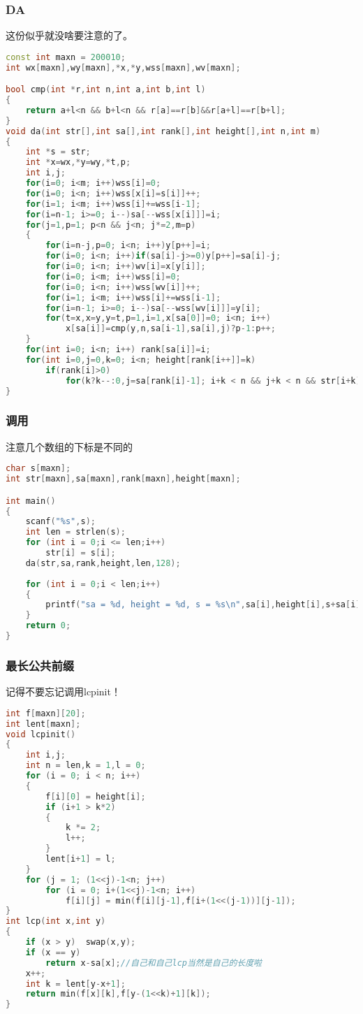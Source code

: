 	\subsubsection{DA}
		这份似乎就没啥要注意的了。
		\begin{lstlisting}[language=c++]
const int maxn = 200010;
int wx[maxn],wy[maxn],*x,*y,wss[maxn],wv[maxn];

bool cmp(int *r,int n,int a,int b,int l)
{
	return a+l<n && b+l<n && r[a]==r[b]&&r[a+l]==r[b+l];
}
void da(int str[],int sa[],int rank[],int height[],int n,int m)
{
	int *s = str;
	int *x=wx,*y=wy,*t,p;
	int i,j;
	for(i=0; i<m; i++)wss[i]=0;
	for(i=0; i<n; i++)wss[x[i]=s[i]]++;
	for(i=1; i<m; i++)wss[i]+=wss[i-1];
	for(i=n-1; i>=0; i--)sa[--wss[x[i]]]=i;
	for(j=1,p=1; p<n && j<n; j*=2,m=p)
	{
		for(i=n-j,p=0; i<n; i++)y[p++]=i;
		for(i=0; i<n; i++)if(sa[i]-j>=0)y[p++]=sa[i]-j;
		for(i=0; i<n; i++)wv[i]=x[y[i]];
		for(i=0; i<m; i++)wss[i]=0;
		for(i=0; i<n; i++)wss[wv[i]]++;
		for(i=1; i<m; i++)wss[i]+=wss[i-1];
		for(i=n-1; i>=0; i--)sa[--wss[wv[i]]]=y[i];
		for(t=x,x=y,y=t,p=1,i=1,x[sa[0]]=0; i<n; i++)
			x[sa[i]]=cmp(y,n,sa[i-1],sa[i],j)?p-1:p++;
	}
	for(int i=0; i<n; i++) rank[sa[i]]=i;
	for(int i=0,j=0,k=0; i<n; height[rank[i++]]=k)
		if(rank[i]>0)
			for(k?k--:0,j=sa[rank[i]-1]; i+k < n && j+k < n && str[i+k]==str[j+k]; k++);
}
		\end{lstlisting}
		
	\subsubsection{调用}
		注意几个数组的下标是不同的
		\begin{lstlisting}[language=c++]
char s[maxn];
int str[maxn],sa[maxn],rank[maxn],height[maxn];

int main()
{
	scanf("%s",s);
	int len = strlen(s);
	for (int i = 0;i <= len;i++)
		str[i] = s[i];
	da(str,sa,rank,height,len,128);
	
	for (int i = 0;i < len;i++)
	{
		printf("sa = %d, height = %d, s = %s\n",sa[i],height[i],s+sa[i]);
	}
	return 0;
}
		\end{lstlisting}
		
	\subsubsection{最长公共前缀}
		记得不要忘记调用lcpinit！
		\begin{lstlisting}[language=c++]
int f[maxn][20];
int lent[maxn];
void lcpinit()
{
	int i,j;
	int n = len,k = 1,l = 0;
	for (i = 0; i < n; i++)
	{
		f[i][0] = height[i];
		if (i+1 > k*2)
		{
			k *= 2;
			l++;
		}
		lent[i+1] = l;
	}
	for (j = 1; (1<<j)-1<n; j++)
		for (i = 0; i+(1<<j)-1<n; i++)
			f[i][j] = min(f[i][j-1],f[i+(1<<(j-1))][j-1]);
}
int lcp(int x,int y)
{
	if (x > y)	swap(x,y);
	if (x == y)
		return x-sa[x];//自己和自己lcp当然是自己的长度啦
	x++;
	int k = lent[y-x+1];
	return min(f[x][k],f[y-(1<<k)+1][k]);
}
		\end{lstlisting}
		
